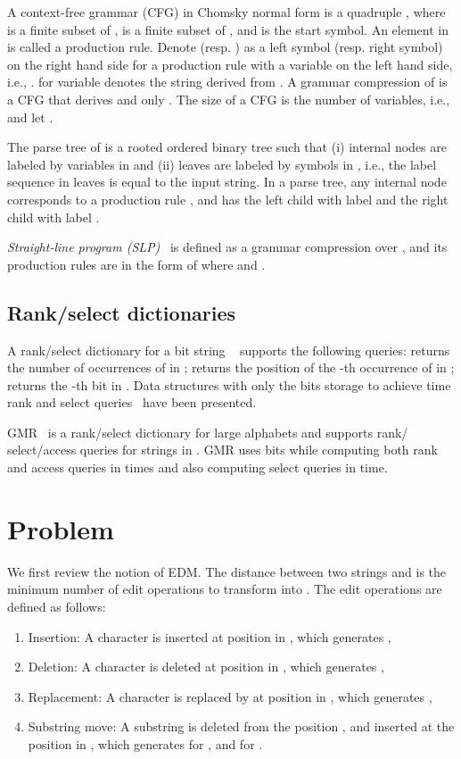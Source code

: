 \documentclass[12pt,a4paper]{scrartcl}
\begin{document}
A context-free grammar (CFG) in Chomsky normal form is a quadruple
, where  is a finite subset of ,  is a
finite subset of , and  is the start
symbol.  An element in  is called a production rule.  Denote 
(resp. ) as a left symbol (resp. right symbol) on the right hand
side for a production rule with a variable  on the left hand side, i.e.,
.   for variable  denotes the
string derived from .  A grammar compression of  is a CFG  that
derives  and only .  The size of a CFG is the number of variables, i.e.,
 and let .

The parse tree of  is a rooted ordered binary tree such that (i) internal
nodes are labeled by variables in  and (ii) leaves are labeled by symbols in
, i.e., the label sequence in leaves is equal to the input string.  In
a parse tree, any internal node  corresponds to a production rule ,
and has the left child with label  and the right child with label .

\emph{Straight-line program (SLP)}~\cite{SLP} is defined as a grammar
compression over , and its production rules are in the form of
 where  and
.

\subsection{Rank/select dictionaries}

A rank/select dictionary for a bit string ~\cite{Jacobson89} supports the
following queries:  returns the number of occurrences of
 in ;  returns the position of
the -th occurrence of  in ;  returns
the -th bit in .  Data structures with only the  bits
storage to achieve  time rank and select queries~\cite{Raman07} have
been presented.

GMR~\cite{Golynski06} is a rank/select dictionary for large alphabets and
supports rank/ select/access queries for strings in .  GMR
uses  bits while
computing both rank and access queries in  times and
also computing select queries in  time.

\section{Problem}

We first review the notion of EDM.
The distance  between two strings  and  is 
the minimum number of edit operations to transform  into .
The edit operations are defined as follows:
\begin{enumerate}
\item Insertion: A character  is inserted at position  in , which generates ,
\item Deletion: A character is deleted at position  in , which generates ,
\item Replacement: A character is replaced by  at position  in , which generates ,
\item Substring move: A substring  is deleted from the position ,
  and inserted at the position  in , which generates
   for , and
   for .
\end{enumerate}
\end{document}
